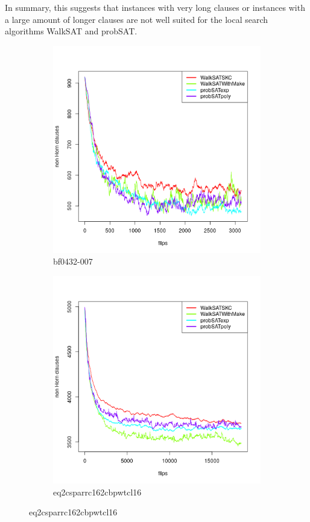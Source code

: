 \documentclass[12pt,a4paper]{article}
\begin{document}
In summary, this suggests that instances with very long clauses or instances with a large amount of longer clauses are not well suited for the local search algorithms WalkSAT and probSAT.
\begin{figure}[H]
  \begin{subfigure}{0.45\textwidth}
    \includegraphics[width=\textwidth]{trends/bf0432-007[SKIP=0].png}
    \caption{bf0432-007}
  \end{subfigure}
    \begin{subfigure}{0.45\textwidth}
    \includegraphics[width=\textwidth]{trends/eq2csparrc162cbpwtcl16[SKIP=0].png}
    \caption{eq2csparrc162cbpwtcl16}
  \end{subfigure}


\end{figure}
\end{document}
